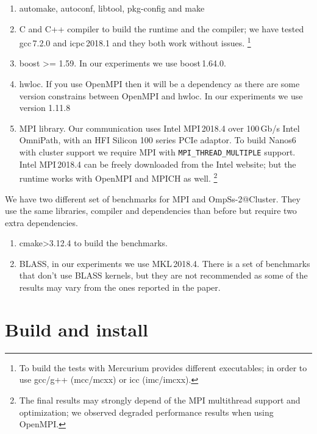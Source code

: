 \documentclass{article}
\newcommand{\code}[1]{\texttt{#1}}
\begin{document}
\begin{enumerate}
    \item automake, autoconf, libtool, pkg-config and make

    \item C and C++ compiler to build the runtime and the compiler; we have
        tested gcc\,7.2.0 and icpc\,2018.1 and they both work without issues.
        \footnote{To build the tests with Mercurium provides different executables;
        in order to use gcc/g++ (mcc/mcxx) or icc (imc/imcxx).}

    \item boost >= 1.59. In our experiments we use boost\,1.64.0.

    \item hwloc. If you use OpenMPI then it will be a dependency as there are some
        version constrains between OpenMPI and hwloc. In our experiments we use
        version 1.11.8

    \item MPI library. Our communication uses Intel MPI\,2018.4 over 100\,Gb/s Intel
        OmniPath, with an HFI Silicon 100 series PCIe adaptor. To build Nanos6
        with cluster support we require MPI with
        \code{MPI\_THREAD\_MULTIPLE} support.  Intel MPI\,2018.4 can be freely
        downloaded from the Intel website; but the runtime works with OpenMPI
        and MPICH as well. \footnote{The final results may strongly depend of
        the MPI multithread support and optimization; we observed degraded
        performance results when using OpenMPI.}
\end{enumerate}

We have two different set of benchmarks for MPI and
OmpSs-2@Cluster. They use the same libraries, compiler and
dependencies than before but require two extra dependencies.

\begin{enumerate}
    \item cmake>3.12.4 to build the benchmarks.
    \item BLASS, in our experiments we use MKL\,2018.4. There is a set of benchmarks
        that don't use BLASS kernels, but they are not recommended as some of the
        results may vary from the ones reported in the paper.
\end{enumerate}

\section{Build and install}
\end{document}
